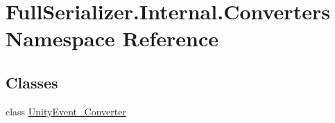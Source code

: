 \hypertarget{namespace_full_serializer_1_1_internal_1_1_converters}{}\section{Full\+Serializer.\+Internal.\+Converters Namespace Reference}
\label{namespace_full_serializer_1_1_internal_1_1_converters}
\subsection*{Classes}
\begin{DoxyCompactItemize}
\item 
class \hyperlink{class_full_serializer_1_1_internal_1_1_converters_1_1_unity_event___converter}{Unity\+Event\+\_\+\+Converter}
\end{DoxyCompactItemize}
